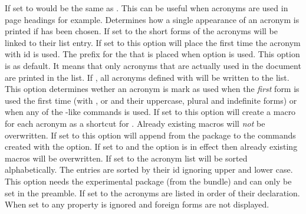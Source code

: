 \documentclass{acro-manual}
\begin{document}
\begin{options}
    If set to   would be the same as .  This can
    be useful when acronyms are used in page headings for example.
    Determines how a single appearance of an acronym is
    printed if  has been chosen.
    If set to  the short forms of the acronyms will be linked to
    their list entry.
    If set to  this option will place
     the first time the acronym with
    \ac{id}  is used. 
    The prefix for the  that is placed when option
     is used.
    This option is  as default.  It means that only acronyms that
    are actually used in the document are printed in the list.  If
    , all acronyms defined with  will be
    written to the list.
    This option determines wether an acronym is mark as used when the
    \emph{first} form is used the first time (with ,  or
     and their uppercase, plural and indefinite forms) or when any
    of the -like commands is used.   
    If set to  this option will create a macro  for
    each acronym as a shortcut for .  Already existing macros
    will \emph{not} be overwritten.
    If set to  this option will append  from the
     package to the commands created with the 
    option.
    If set to  and the option  is in effect
    then already existing macros will be overwritten.
    If set to  the acronym list will be sorted alphabetically.  The
    entries are sorted by their \acs{id} ignoring upper and lower case.  This
    option needs the experimental package  (from the
     bundle) and can only be set in the preamble.
    If set to  the acronyms are listed in order of their
    declaration.
    When set to  any  property is ignored and
    foreign forms are not displayed.

\end{options}
\end{document}
